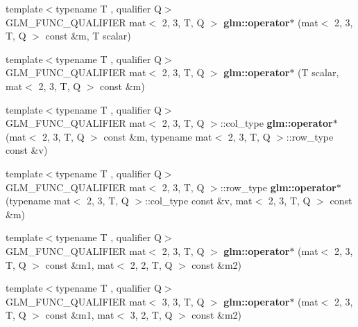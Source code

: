 \begin{DoxyCompactItemize}
\item 
\mbox{\label{type__mat2x3_8inl_a69ee47661ba2b81429d45986dde05bb3}} 
{\footnotesize template$<$typename T , qualifier Q$>$ }\\G\+L\+M\+\_\+\+F\+U\+N\+C\+\_\+\+Q\+U\+A\+L\+I\+F\+I\+ER mat$<$ 2, 3, T, Q $>$ {\bfseries glm\+::operator$\ast$} (mat$<$ 2, 3, T, Q $>$ const \&m, T scalar)
\item 
\mbox{\label{type__mat2x3_8inl_a42ae1198e0540a336fea992fa5ed8963}} 
{\footnotesize template$<$typename T , qualifier Q$>$ }\\G\+L\+M\+\_\+\+F\+U\+N\+C\+\_\+\+Q\+U\+A\+L\+I\+F\+I\+ER mat$<$ 2, 3, T, Q $>$ {\bfseries glm\+::operator$\ast$} (T scalar, mat$<$ 2, 3, T, Q $>$ const \&m)
\item 
\mbox{\label{type__mat2x3_8inl_aa648a9f47ee04c0dfbdbc2e22414e85f}} 
{\footnotesize template$<$typename T , qualifier Q$>$ }\\G\+L\+M\+\_\+\+F\+U\+N\+C\+\_\+\+Q\+U\+A\+L\+I\+F\+I\+ER mat$<$ 2, 3, T, Q $>$\+::col\+\_\+type {\bfseries glm\+::operator$\ast$} (mat$<$ 2, 3, T, Q $>$ const \&m, typename mat$<$ 2, 3, T, Q $>$\+::row\+\_\+type const \&v)
\item 
\mbox{\label{type__mat2x3_8inl_a34f192659468361eab2b1c9d36f9fb3d}} 
{\footnotesize template$<$typename T , qualifier Q$>$ }\\G\+L\+M\+\_\+\+F\+U\+N\+C\+\_\+\+Q\+U\+A\+L\+I\+F\+I\+ER mat$<$ 2, 3, T, Q $>$\+::row\+\_\+type {\bfseries glm\+::operator$\ast$} (typename mat$<$ 2, 3, T, Q $>$\+::col\+\_\+type const \&v, mat$<$ 2, 3, T, Q $>$ const \&m)
\item 
\mbox{\label{type__mat2x3_8inl_a01fe48787b838c7f86710b5cca61a80d}} 
{\footnotesize template$<$typename T , qualifier Q$>$ }\\G\+L\+M\+\_\+\+F\+U\+N\+C\+\_\+\+Q\+U\+A\+L\+I\+F\+I\+ER mat$<$ 2, 3, T, Q $>$ {\bfseries glm\+::operator$\ast$} (mat$<$ 2, 3, T, Q $>$ const \&m1, mat$<$ 2, 2, T, Q $>$ const \&m2)
\item 
\mbox{\label{type__mat2x3_8inl_a08f51348906a42ebed25fa41febde1bd}} 
{\footnotesize template$<$typename T , qualifier Q$>$ }\\G\+L\+M\+\_\+\+F\+U\+N\+C\+\_\+\+Q\+U\+A\+L\+I\+F\+I\+ER mat$<$ 3, 3, T, Q $>$ {\bfseries glm\+::operator$\ast$} (mat$<$ 2, 3, T, Q $>$ const \&m1, mat$<$ 3, 2, T, Q $>$ const \&m2)

\end{DoxyCompactItemize}
